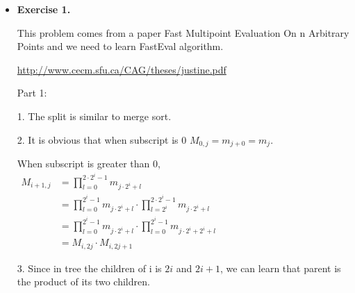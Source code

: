 \documentclass{article}
\begin{document}
\noindent

\noindent{}

\begin{itemize}

\item \textbf{Exercise 1.}

This problem comes from a paper Fast Multipoint Evaluation On n
Arbitrary Points and we need to learn FastEval algorithm. 

\url{http://www.cecm.sfu.ca/CAG/theses/justine.pdf}

Part 1:

1. The split is similar to merge sort. 
\begin{center}
\end{center}

2. It is obvious that when subscript is 0 $M_{0, j}=m_{j+0}= m_{j}$.

When subscript is greater than 0, 
$\begin{aligned}
M_{i+1, j} &=\prod_{l=0}^{2 \cdot 2^{i}-1} m_{j \cdot 2^{i}+l} \\
&=\prod_{l=0}^{2^{i}-1} m_{j \cdot 2^{i}+l} \cdot \prod_{l=2^{i}}^{2 \cdot 2^{i}-1} m_{j \cdot 2^{i}+l} \\
&=\prod_{l=0}^{2^{i}-1} m_{j \cdot 2^{i}+l} \cdot \prod_{l=0}^{2^{i}-1} m_{j \cdot 2^{i}+2^{i}+l} \\
&=M_{i, 2 j} \cdot M_{i, 2 j+1}
\end{aligned}$

3. Since in tree the children of i is $2i$ and $2i+1$, we can learn that parent is the product of its two children.


\end{itemize}
\end{document}

